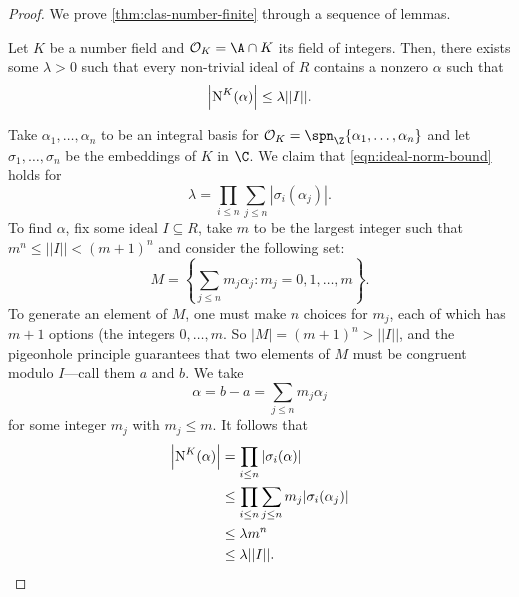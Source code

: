 \begin{proof}
    We prove \autoref{thm:clas-number-finite} through a sequence of lemmas.

    \begin{lemma}
        Let $K$ be a number field and $\mathcal O_K = \A \cap K$ its field of integers. Then, there exists some $\lambda > 0$ such that every non-trivial ideal of $R$ contains a nonzero $\alpha$ such that
        \begin{equation}
            \label{eqn:ideal-norm-bound}
            \left| \operatorname{N}^K(\alpha) \right| \leq \lambda || I ||.
        \end{equation}
    \end{lemma}

    Take $\alpha_1, \ldots, \alpha_n$ to be an integral basis for $\mathcal O_K = \spn_\Z\{\alpha_1, \ldots, \alpha_n\}$ and let $\sigma_1, \ldots, \sigma_n$ be the embeddings of $K$ in $\C$. We claim that \autoref{eqn:ideal-norm-bound} holds for
    \begin{equation}
        \lambda = \prod_{i \leq n} \sum_{j \leq n} | \sigma_i(\alpha_j)|.
    \end{equation}
    To find $\alpha$, fix some ideal $I \subseteq R$, take $m$ to be the largest integer such that $m^n \leq ||I|| < (m+1)^n$ and consider the following set:
    \begin{equation}
        M = \left\{ \sum_{j \leq n} m_j \alpha_j : m_j = 0, 1, \ldots, m \right\}.
    \end{equation}
    To generate an element of $M$, one must make $n$ choices for $m_j$, each of which has $m+1$ options (the integers $0, \ldots, m$. So $|M| = (m+1)^n > ||I||$, and the pigeonhole principle guarantees that two elements of $M$ must be congruent modulo $I$---call them $a$ and $b$. We take
    \begin{equation}
        \label{eqn:class-group-proof-alpha}
        \alpha = b - a = \sum_{j \leq n} m_j \alpha_j
    \end{equation}
    for some integer $m_j$ with $m_j \leq m$. It follows that
    \begin{equation}
        \begin{aligned}
            \left| \operatorname{N}^K(\alpha) \right|
             & = \prod_{i \leq n} |\sigma_i(\alpha)|                           \\
             & \leq \prod_{i \leq n} \sum_{j \leq n} m_j | \sigma_i(\alpha_j)| \\
             & \leq \lambda m^n                                                \\
             & \leq \lambda || I ||.
        \end{aligned}
    \end{equation}


\end{proof}
